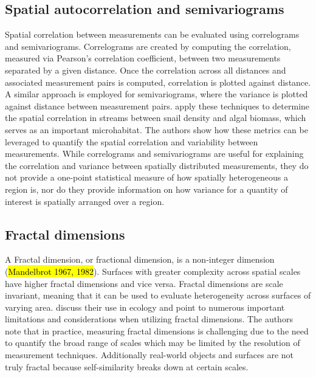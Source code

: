 \subsection{Spatial autocorrelation and semivariograms}
Spatial correlation between measurements can be evaluated using correlograms and semivariograms. Correlograms are created by computing the correlation, measured via Pearson’s correlation coefficient, between two measurements separated by a given distance. Once the correlation across all distances and associated measurement pairs is computed, correlation is plotted against distance. A similar approach is employed for semivariograms, where the variance is plotted against distance between measurement pairs. \cite{cooper_quantifying_1997} apply these techniques to determine the spatial correlation in streams between snail density and algal biomass, which serves as an important microhabitat. The authors show how these metrics can be leveraged to quantify the spatial correlation and variability between measurements. While correlograms and semivariograms are useful for explaining the correlation and variance between spatially distributed measurements, they do not provide a one-point statistical measure of how spatially heterogeneous a region is, nor do they provide information on how variance for a quantity of interest is spatially arranged over a region.

\subsection{Fractal dimensions}
 A Fractal dimension, or fractional dimension, is a non-integer dimension (\hl{Mandelbrot 1967, 1982}). Surfaces with greater complexity across spatial scales have higher fractal dimensions and vice versa. Fractal dimensions are scale invariant, meaning that it can be used to evaluate heterogeneity across surfaces of varying area. \cite{loke_measuring_2022} discuss their use in ecology and point to numerous important limitations and considerations when utilizing fractal dimensions. The authors note that in practice, measuring fractal dimensions is challenging due to the need to quantify the broad range of scales which may be limited by the resolution of measurement techniques. Additionally real-world objects and surfaces are not truly fractal because self-similarity breaks down at certain scales. 

